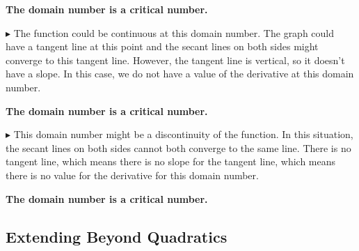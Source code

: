 \documentclass{ximera}
\begin{document}
\begin{center}
\textbf{\textcolor{blue!55!black}{The domain number is a critical number.}}
\end{center}

\textbf{\textcolor{blue!55!black}{$\blacktriangleright$}}  The function could be continuous at this domain number. The graph could have a tangent line at this point and the secant lines on both sides might converge to this tangent line.  However, the tangent line is vertical, so it doesn't have a slope. In this case, we do not have a value of the derivative at this domain number. \\

\begin{center}
\textbf{\textcolor{blue!55!black}{The domain number is a critical number.}}
\end{center}

\textbf{\textcolor{blue!55!black}{$\blacktriangleright$}}  This domain number might be a discontinuity of the function. In this situation, the secant lines on both sides cannot both converge to the same line.  There is no tangent line, which means there is no slope for the tangent line, which means there is no value for the derivative for this domain number. \\

\begin{center}
\textbf{\textcolor{blue!55!black}{The domain number is a critical number.}}
\end{center}











































\subsection*{Extending Beyond Quadratics} 
\end{document}
